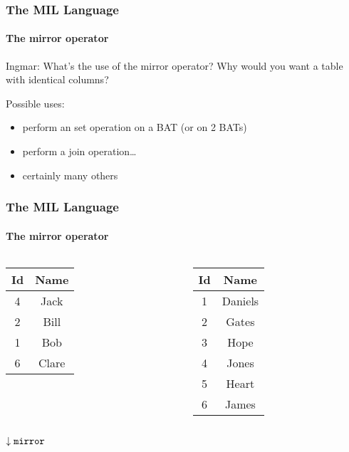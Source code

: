 \documentclass{beamer}
\begin{document}
\begin{frame}
  \frametitle{The MIL Language}
  \framesubtitle{The mirror operator}

  \begin{block}{Ingmar:}
  What's the use of the mirror operator? Why would you want a table with identical columns?
  \end{block}

  Possible uses:

  \begin{itemize}
  \item perform an set operation on a BAT (or on 2 BATs)
  \item perform a join operation\ldots
  \item certainly many others
  \end{itemize}

\end{frame}

\begin{frame}
  \frametitle{The MIL Language}
  \framesubtitle{The mirror operator}

  \begin{columns}

  \column{1cm}

  \begin{tabular}{|c|c|}
    \hline
    Id & Name \\
    \hline
    4 & Jack \\
    2 & Bill \\
    1 & Bob \\
    6 & Clare \\
    \hline
  \end{tabular}

  \column{1cm}

  \begin{tabular}{|c|c|}
    \hline
    Id & Name \\
    \hline
    1 & Daniels \\
    2 & Gates \\
    3 & Hope \\
    4 & Jones \\
    5 & Heart \\
    6 & James \\
    \hline
  \end{tabular}

  \end{columns}

  \pause

  \begin{center}$\downarrow{\tt mirror}$\end{center}

\end{frame}
\end{document}
